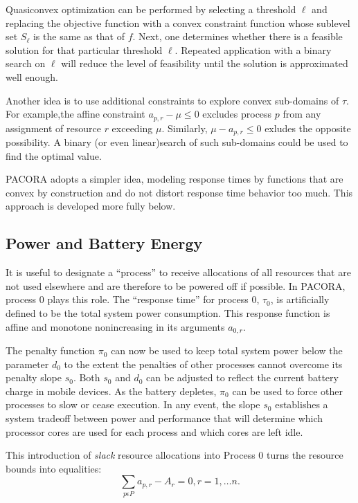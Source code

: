Quasiconvex optimization can be performed by selecting a threshold $\ell$ and replacing the objective function
with a convex constraint function whose sublevel set $S_\ell$ is the same as that of $f$.
Next, one determines whether there is a feasible solution for that particular threshold $\ell$.
Repeated application with a binary search on $\ell$ will reduce the level of feasibility
until the solution is approximated well enough.

Another idea is to use additional constraints to explore convex sub-domains of $\tau$.
For example,the affine constraint $a_{p,r} - \mu \leq 0$ excludes process $p$ from any assignment of resource $r$ exceeding $\mu$.  Similarly, $\mu - a_{p,r} \leq 0$ exludes the opposite possibility.
A binary (or even linear)search of such sub-domains could be used to find the optimal value.

PACORA adopts a simpler idea, modeling response times by functions that are convex by construction
and do not distort response time behavior too much.  This approach is developed more fully below.

\subsection*{Power and Battery Energy}

It is useful to designate a ``process'' to receive allocations of all resources
that are not used elsewhere and are therefore to be powered off if possible.
In PACORA, process 0 plays this role.
The ``response time'' for process 0, $\tau_0$,
is artificially defined to be the total system power consumption.
This response function is affine and monotone nonincreasing in its arguments $a_{0,r}$.

The penalty function $\pi_0$ can now be used to keep total system power below the parameter $d_0$
to the extent the penalties of other processes cannot overcome its penalty slope $s_0$.
Both $s_0$ and $d_0$ can be adjusted to reflect the current battery charge in mobile devices.
As the battery depletes, $\pi_0$ can be used to force other processes to slow or cease execution.
In any event, the slope $s_0$ establishes a system tradeoff between power and performance that
will determine which processor cores are used for each process and which cores are left idle. 

This introduction of \emph{slack} resource allocations into Process 0 turns the resource bounds into equalities:
\begin{displaymath}
\sum_{p\epsilon P} a_{p,r} - A_r = 0, r = 1,\dots n.
\end{displaymath}

